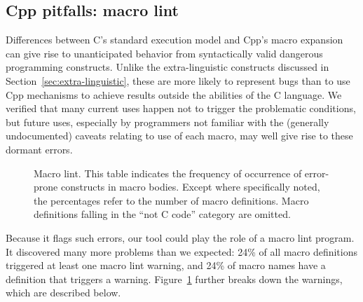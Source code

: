 \documentclass[10pt]{article}
\newcommand{\captionsmall}[1]{\caption[]{\small #1}}
\begin{document}
\begin{description}
\end{description}



\subsection{Cpp pitfalls:  macro lint}
\label{sec:lint}

Differences between C's standard execution model and Cpp's macro expansion can
give rise to unanticipated behavior from syntactically valid dangerous
programming constructs.  Unlike the extra-linguistic constructs discussed
in Section~\ref{sec:extra-linguistic}, these are more likely to represent bugs
than to use Cpp mechanisms to achieve results outside the abilities of the
C language.  We verified that many current uses happen not to trigger the
problematic conditions, but future uses, especially by programmers not
familiar with the (generally undocumented) caveats relating to use of each
macro, may well give rise to these dormant errors.

\begin{figure}
  {\small\centerline{}}
  
  \captionsmall{Macro lint.  This table indicates the frequency of occurrence of
    error-prone constructs in macro bodies.  Except where specifically
    noted, the percentages refer to the number of macro definitions.  Macro
    definitions falling in the ``not C code'' category are omitted.}
  \label{fig:macro-lint}
\end{figure}

Because it flags such errors, our tool could play the role of a macro lint
program.  It discovered many more problems than we expected: 24\% of all
macro definitions triggered at least one macro lint warning, and 24\% of
macro names have a definition that triggers a warning.
Figure~\ref{fig:macro-lint} further breaks down the warnings, which are
described below.
\end{document}
